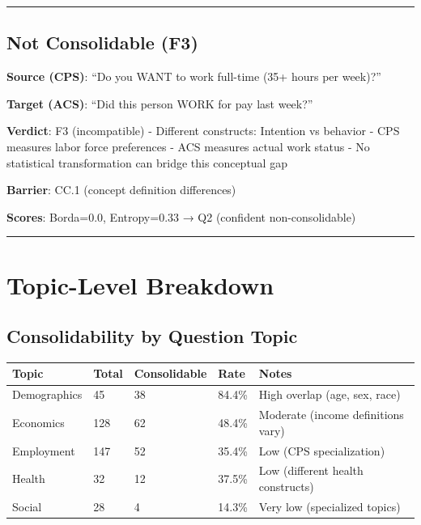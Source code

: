 \documentclass[
  letterpaper,
]{report}
\begin{document}
\begin{center}\rule{0.5\linewidth}{0.5pt}\end{center}

\subsection{Not Consolidable (F3)}\label{not-consolidable-f3}

\textbf{Source (CPS)}: ``Do you WANT to work full-time (35+ hours per
week)?''

\textbf{Target (ACS)}: ``Did this person WORK for pay last week?''

\textbf{Verdict}: F3 (incompatible) - Different constructs: Intention vs
behavior - CPS measures labor force preferences - ACS measures actual
work status - No statistical transformation can bridge this conceptual
gap

\textbf{Barrier}: CC.1 (concept definition differences)

\textbf{Scores}: Borda=0.0, Entropy=0.33 → Q2 (confident
non-consolidable)

\begin{center}\rule{0.5\linewidth}{0.5pt}\end{center}

\section{Topic-Level Breakdown}\label{topic-level-breakdown}

\subsection{Consolidability by Question
Topic}\label{consolidability-by-question-topic}

\begin{longtable}[]{@{}lllll@{}}
\toprule\noalign{}
Topic & Total & Consolidable & Rate & Notes \\
\midrule\noalign{}
\endhead
\bottomrule\noalign{}
\endlastfoot
Demographics & 45 & 38 & 84.4\% & High overlap (age, sex, race) \\
Economics & 128 & 62 & 48.4\% & Moderate (income definitions vary) \\
Employment & 147 & 52 & 35.4\% & Low (CPS specialization) \\
Health & 32 & 12 & 37.5\% & Low (different health constructs) \\
Social & 28 & 4 & 14.3\% & Very low (specialized topics) \\
\end{longtable}
\end{document}
